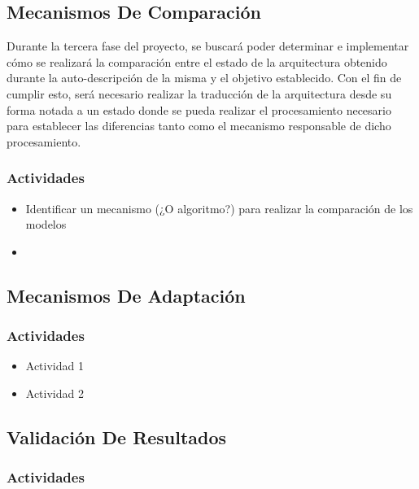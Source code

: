 \documentclass[12pt]{article}
\begin{document}
    \subsection{Mecanismos De Comparación}

    Durante la tercera fase del proyecto, se buscará poder determinar e implementar cómo se realizará la comparación entre el estado de la arquitectura obtenido durante la auto-descripción de la misma y el objetivo establecido. Con el fin de cumplir esto, será necesario realizar la traducción de la arquitectura desde su forma notada a un estado donde se pueda realizar el procesamiento necesario para establecer las diferencias tanto como el mecanismo responsable de dicho procesamiento.

    \subsubsection{Actividades}

    \begin{itemize}
        \item Identificar un mecanismo (¿O algoritmo?) para realizar la comparación de los modelos
        \item 
    \end{itemize}    

    \subsection{Mecanismos De Adaptación}
    

    \subsubsection{Actividades}

    \begin{itemize}
        \item Actividad 1
        \item Actividad 2
    \end{itemize}  

    \subsection{Validación De Resultados}


    \subsubsection{Actividades}
\end{document}

